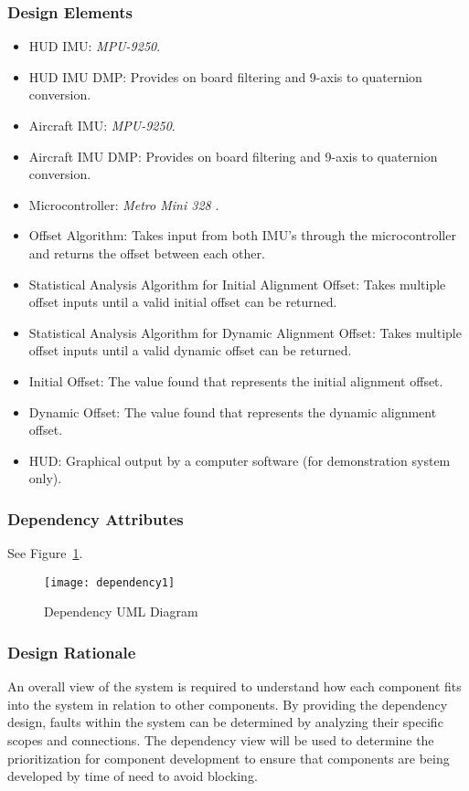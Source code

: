 		\subsubsection{Design Elements}
		\begin{itemize}
			\item HUD IMU: \textit{MPU-9250}.
			\item HUD IMU DMP: Provides on board filtering and 9-axis to quaternion conversion.
			\item Aircraft IMU: \textit{MPU-9250}.
			\item Aircraft IMU DMP: Provides on board filtering and 9-axis to quaternion conversion.
			\item Microcontroller: \textit{Metro Mini 328} .
			\item Offset Algorithm: Takes input from both IMU’s through the microcontroller and returns the offset between each other.
			\item Statistical Analysis Algorithm for Initial Alignment Offset: Takes multiple offset inputs until a valid initial offset can be returned.
			\item Statistical Analysis Algorithm for Dynamic Alignment Offset: Takes multiple offset inputs until a valid dynamic offset can be returned.
			\item Initial Offset: The value found that represents the initial alignment offset.
			\item Dynamic Offset: The value found that represents the dynamic alignment offset.
			\item HUD: Graphical output by a computer software (for demonstration system only).\\
		\end{itemize}

		\subsubsection{Dependency Attributes}
		See Figure~\ref{fig:dependency1}.\\

		\begin{figure}
			\centering
		 		\caption{Dependency UML Diagram}			%
		      	\texttt{[image: dependency1]}
		    \label{fig:dependency1}
		\end{figure}

		\subsubsection{Design Rationale}
		An overall view of the system is required to understand how each component fits into the system in relation to other components. By providing the dependency design, faults within the system can be determined by analyzing their specific scopes and connections. The dependency view will be used to determine the prioritization for component development to ensure that components are being developed by time of need to avoid blocking.

